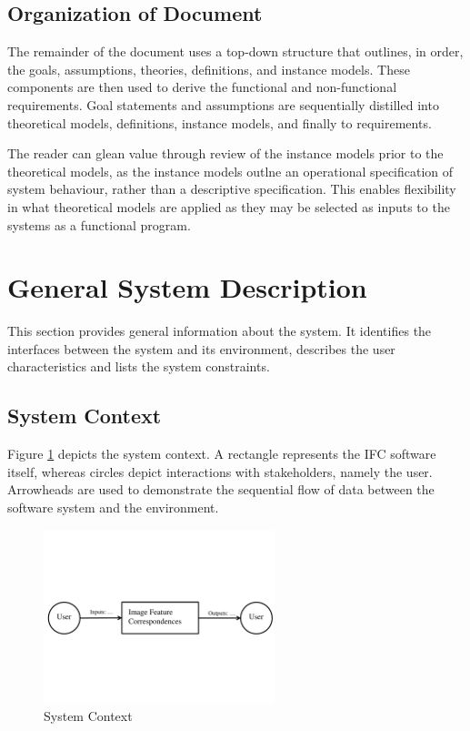\documentclass[12pt]{article}
\begin{document}
\subsection{Organization of Document}
The remainder of the document uses a top-down structure that outlines, in order, 
the goals, assumptions, theories, definitions, and instance models. These 
components are then used to derive the functional and non-functional requirements. 
Goal statements and assumptions are sequentially distilled into theoretical models, 
definitions, instance models, and finally to requirements.

The reader can glean value through review of the instance models prior to 
the theoretical models, as the instance models outlne an operational specification of 
system behaviour, rather than a descriptive specification. This enables flexibility 
in what theoretical models are applied as they may be selected as inputs to the 
systems as a functional program. 

\section{General System Description}

This section provides general information about the system.  It identifies the
interfaces between the system and its environment, describes the user
characteristics and lists the system constraints.

\subsection{System Context}
Figure \ref{Fig_SystemContext} depicts the system context. A rectangle represents 
the IFC software itself, whereas circles depict interactions with stakeholders, 
namely the user. Arrowheads are used to demonstrate the sequential flow of data 
between the software system and the environment.

\begin{figure}[h!]
\begin{center}
 \includegraphics[width=0.6\textwidth]{SystemContextFigure}
\caption{System Context}
\label{Fig_SystemContext} 
\end{center}
\end{figure}
\end{document}
